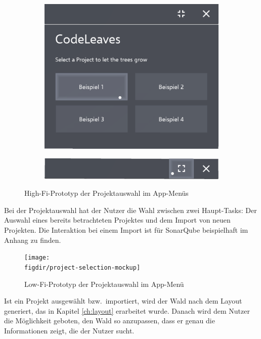 \begin{figure}[htb]
  \centering
  \begin{subfigure}[t]{\textwidth}
    \centering
    \includegraphics[width=.8\textwidth]{figures/project-selection}
     \label{fig:project-selection}
  \end{subfigure}
  \par\bigskip
  \begin{subfigure}[t]{\textwidth}
    \centering
  	\includegraphics[width=.8\textwidth]{figures/title-bar}
  	 \label{fig:title-bar}
  \end{subfigure}
  \caption{High-Fi-Prototyp der Projektauswahl im App-Menüs} \label{fig:app-menu}
\end{figure}

Bei der Projektauswahl hat der Nutzer die Wahl zwischen zwei Haupt-Tasks: Der Auswahl eines bereits betrachteten Projektes und dem Import von neuen Projekten. Die Interaktion bei einem Import ist für SonarQube beispielhaft im Anhang zu finden.

\begin{figure}[htb]
  \texttt{[image: \\figdir/project-selection-mockup]}
  \caption{Low-Fi-Prototyp der Projektauswahl im App-Menü}
  \label{fig:project-selection-mockup}
\end{figure}

Ist ein Projekt ausgewählt bzw.\ importiert, wird der Wald nach dem Layout generiert, das in Kapitel \ref{ch:layout} erarbeitet wurde. Danach wird dem Nutzer die Möglichkeit geboten, den Wald so anzupassen, dass er genau die Informationen zeigt, die der Nutzer sucht.

